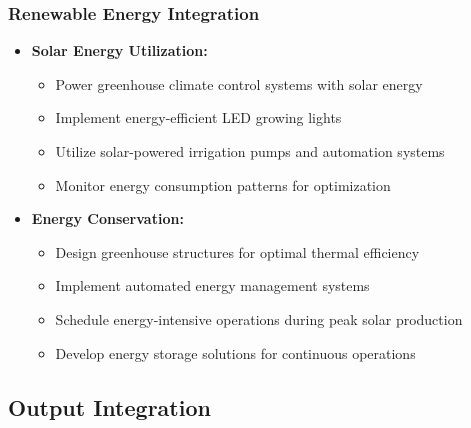 \subsubsection{Renewable Energy Integration}
\begin{itemize}
    \item \textbf{Solar Energy Utilization:}
    \begin{itemize}
        \item Power greenhouse climate control systems with solar energy
        \item Implement energy-efficient LED growing lights
        \item Utilize solar-powered irrigation pumps and automation systems
        \item Monitor energy consumption patterns for optimization
    \end{itemize}
    
    \item \textbf{Energy Conservation:}
    \begin{itemize}
        \item Design greenhouse structures for optimal thermal efficiency
        \item Implement automated energy management systems
        \item Schedule energy-intensive operations during peak solar production
        \item Develop energy storage solutions for continuous operations
    \end{itemize}
\end{itemize}

\subsection{Output Integration}

